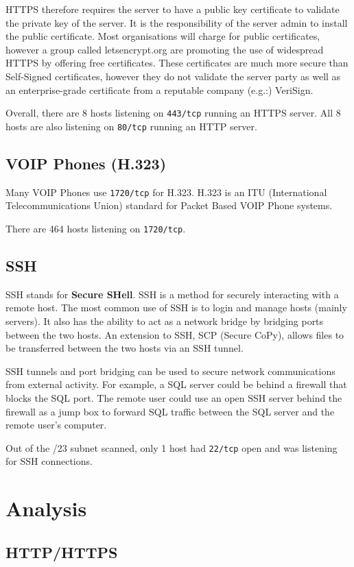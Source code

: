 \documentclass[a4paper]{article}
\begin{document}
HTTPS therefore requires the server to have a public key certificate to validate the private key of the server.
It is the responsibility of the server admin to install the public certificate.
Most organisations will charge for public certificates, however a group called letsencrypt.org are promoting the use of widespread HTTPS by offering free certificates.
These certificates are much more secure than Self-Signed certificates, however they do not validate the server party as well as an enterprise-grade certificate from a reputable company (e.g.:) VeriSign.

Overall, there are 8 hosts listening on \texttt{443/tcp} running an HTTPS server.
All 8 hosts are also listening on \texttt{80/tcp} running an HTTP server.

\subsection{VOIP Phones (H.323)}
Many VOIP Phones use \texttt{1720/tcp} for H.323.
H.323 is an ITU (International Telecommunications Union) standard for Packet Based VOIP Phone systems.

There are 464 hosts listening on \texttt{1720/tcp}.

\subsection{SSH}
SSH stands for \textbf{Secure SHell}.
SSH is a method for securely interacting with a remote host.
The most common use of SSH is to login and manage hosts (mainly servers).
It also has the ability to act as a network bridge by bridging ports between the two hosts.
An extension to SSH, SCP (Secure CoPy), allows files to be transferred between the two hosts via an SSH tunnel.

SSH tunnels and port bridging can be used to secure network communications from external activity.
For example, a SQL server could be behind a firewall that blocks the SQL port.
The remote user could use an open SSH server behind the firewall as a jump box to forward SQL traffic between the SQL server and the remote user's computer.

Out of the /23 subnet scanned, only 1 host had \texttt{22/tcp} open and was listening for SSH connections.

\section{Analysis}
\subsection{HTTP/HTTPS}
\end{document}
